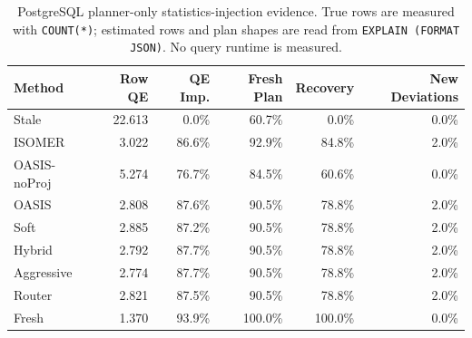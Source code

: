\begin{table}[t]
  \centering
  \small
  \caption{PostgreSQL planner-only statistics-injection evidence. True rows are measured with \texttt{COUNT(*)}; estimated rows and plan shapes are read from \texttt{EXPLAIN (FORMAT JSON)}. No query runtime is measured.}
  \label{tab:postgres_planner_stats_injection}
  \setlength{\tabcolsep}{4pt}
  \begin{tabular}{lrrrrr}
    \toprule
    Method & Row QE & QE Imp. & Fresh Plan & Recovery & New Deviations \\
    \midrule
    Stale & 22.613 & 0.0\% & 60.7\% & 0.0\% & 0.0\% \\
    ISOMER & 3.022 & 86.6\% & 92.9\% & 84.8\% & 2.0\% \\
    OASIS-noProj & 5.274 & 76.7\% & 84.5\% & 60.6\% & 0.0\% \\
    OASIS & 2.808 & 87.6\% & 90.5\% & 78.8\% & 2.0\% \\
    Soft & 2.885 & 87.2\% & 90.5\% & 78.8\% & 2.0\% \\
    Hybrid & 2.792 & 87.7\% & 90.5\% & 78.8\% & 2.0\% \\
    Aggressive & 2.774 & 87.7\% & 90.5\% & 78.8\% & 2.0\% \\
    Router & 2.821 & 87.5\% & 90.5\% & 78.8\% & 2.0\% \\
    Fresh & 1.370 & 93.9\% & 100.0\% & 100.0\% & 0.0\% \\
    \bottomrule
  \end{tabular}
\end{table}
